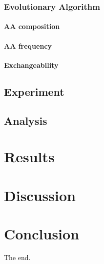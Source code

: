 \documentclass{article}
\begin{document}
\subsubsection{Evolutionary Algorithm}

\paragraph{AA composition}

\paragraph{AA frequency}

\paragraph{Exchangeability}


\subsection{Experiment}


\subsection{Analysis}


\section{Results}



\section{Discussion}



\section{Conclusion}

The end.

\printbibliography

\appendix
\end{document}
